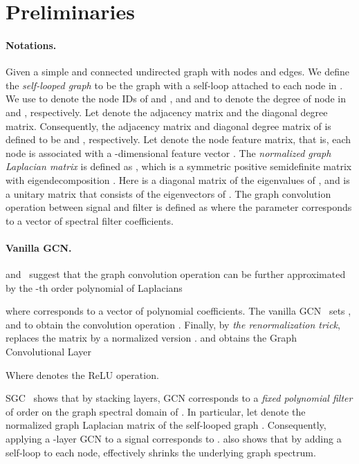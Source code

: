 \documentclass{article}
\begin{document}
 \section{Preliminaries}
\label{sec:pre}

\paragraph{Notations.}
Given a simple and connected undirected graph  with  nodes and  edges. We  define the {\em self-looped graph}   to be the graph with a self-loop attached to each node in . 
We use  to denote the node IDs of  and , and  and  to denote the degree of node  in  and , respectively.  Let  denote the adjacency matrix and  the diagonal degree matrix. Consequently,
the adjacency matrix and diagonal degree matrix of   is defined to be  and 
, respectively. 
Let  denote the node feature matrix, that is, each node  is associated with a -dimensional feature vector . The {\em normalized graph Laplacian matrix} is defined as   , which is a symmetric positive semidefinite matrix with eigendecomposition . Here  is a diagonal matrix of the eigenvalues of , and   is a unitary matrix that consists of the eigenvectors of . 
The graph convolution operation between signal   and  filter  is defined as
 where the parameter  corresponds to a vector of spectral filter coefficients. 

\paragraph{Vanilla GCN.}
\cite{DBLP:conf/iclr/KipfW17}  and~\cite{DBLP:conf/nips/DefferrardBV16} suggest that the graph convolution operation can be further approximated by the -th order polynomial of Laplacians

where   corresponds to a vector of polynomial coefficients. The vanilla GCN~\cite{DBLP:conf/iclr/KipfW17}  sets ,  and  to obtain the convolution operation . Finally, by {\em the renormalization trick}, \cite{DBLP:conf/iclr/KipfW17} replaces the matrix  by a normalized version . and obtains the Graph Convolutional Layer

Where  denotes the ReLU operation.
  

SGC~\cite{pmlr-v97-wu19e} shows that by stacking  layers, GCN corresponds to a {\em  fixed  polynomial filter} of order  on the graph spectral domain of . In particular, let  denote 
the normalized graph Laplacian matrix  of the self-looped graph .  Consequently, applying a -layer GCN to a signal  corresponds to  . \cite{pmlr-v97-wu19e}  also shows that by adding a self-loop to each node,  effectively shrinks the underlying graph spectrum.
\end{document}

